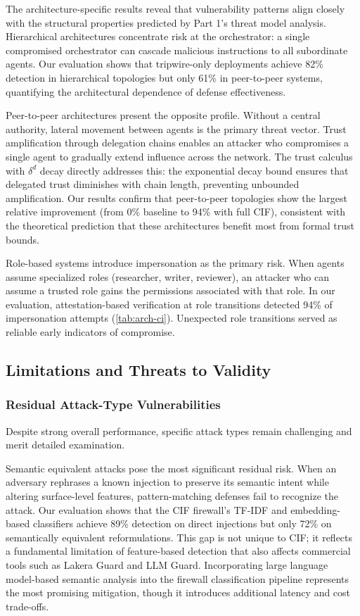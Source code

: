 \documentclass[
]{article}
\begin{document}
The architecture-specific results reveal that vulnerability patterns
align closely with the structural properties predicted by Part 1's
threat model analysis. Hierarchical architectures concentrate risk at
the orchestrator: a single compromised orchestrator can cascade
malicious instructions to all subordinate agents. Our evaluation shows
that tripwire-only deployments achieve 82\% detection in hierarchical
topologies but only 61\% in peer-to-peer systems, quantifying the
architectural dependence of defense effectiveness.

Peer-to-peer architectures present the opposite profile. Without a
central authority, lateral movement between agents is the primary threat
vector. Trust amplification through delegation chains enables an
attacker who compromises a single agent to gradually extend influence
across the network. The trust calculus with \(\delta^d\) decay directly
addresses this: the exponential decay bound ensures that delegated trust
diminishes with chain length, preventing unbounded amplification. Our
results confirm that peer-to-peer topologies show the largest relative
improvement (from 0\% baseline to 94\% with full CIF), consistent with
the theoretical prediction that these architectures benefit most from
formal trust bounds.

Role-based systems introduce impersonation as the primary risk. When
agents assume specialized roles (researcher, writer, reviewer), an
attacker who can assume a trusted role gains the permissions associated
with that role. In our evaluation, attestation-based verification at
role transitions detected 94\% of impersonation attempts
(\cref{tab:arch-ci}). Unexpected role transitions served as reliable
early indicators of compromise.

\subsection{Limitations and Threats to
Validity}\label{limitations-and-threats-to-validity}

\subsubsection{Residual Attack-Type
Vulnerabilities}\label{residual-attack-type-vulnerabilities}

Despite strong overall performance, specific attack types remain
challenging and merit detailed examination.

Semantic equivalent attacks pose the most significant residual risk.
When an adversary rephrases a known injection to preserve its semantic
intent while altering surface-level features, pattern-matching defenses
fail to recognize the attack. Our evaluation shows that the CIF
firewall's TF-IDF and embedding-based classifiers achieve 89\% detection
on direct injections but only 72\% on semantically equivalent
reformulations. This gap is not unique to CIF; it reflects a fundamental
limitation of feature-based detection that also affects commercial tools
such as Lakera Guard and LLM Guard. Incorporating large language
model-based semantic analysis into the firewall classification pipeline
represents the most promising mitigation, though it introduces
additional latency and cost trade-offs.
\end{document}
